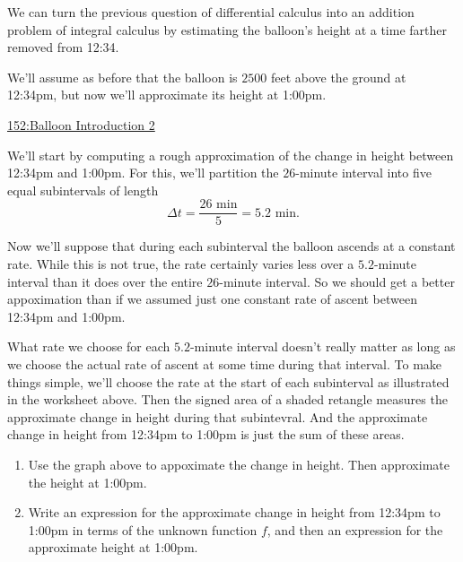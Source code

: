 \documentclass{ximera}
\begin{document}
We can turn the previous question of differential calculus into an addition problem of integral calculus by estimating the balloon's height at a time farther removed from 12:34. 

\begin{example} \label{ExLKDrDEfRE9}

We'll assume as before that the balloon is $2500$ feet above the ground at 12:34pm, but now we'll approximate its height at 1:00pm.

\begin{onlineOnly}
    \begin{center}
\end{center}
\end{onlineOnly}

\href{https://www.desmos.com/calculator/h6cworakdw}{152:Balloon Introduction 2}

We'll start by computing a rough approximation of the change in height between 12:34pm and 1:00pm. For this, we'll partition the $26$-minute interval into five equal subintervals of length 
\[
  \Delta t = \frac{26\text{ min}}{5} = 5.2 \text{ min}.
\]
 
Now we'll suppose that during each subinterval the balloon ascends at a constant rate. While this is not true, the rate certainly varies less over a $5.2$-minute interval than it does over the entire $26$-minute interval. So we should get a better appoximation  than if we assumed just one constant rate of ascent between 12:34pm and 1:00pm.

What rate we choose for each $5.2$-minute interval doesn't really matter as long as we choose the actual rate of ascent at some time during that interval. To make things simple, we'll choose the rate at the start of each subinterval as illustrated in the worksheet above. Then the signed area of a shaded retangle measures the approximate change in height during that subintevral. And the approximate change in height from 12:34pm to 1:00pm is just the sum of these areas.

\begin{enumerate}
\item Use the graph above to appoximate the change in height. Then approximate the height at 1:00pm.

\item Write an expression for the approximate change in height from 12:34pm to 1:00pm in terms of the unknown function $f$, and then an expression for the approximate height at 1:00pm.


\end{enumerate}
\end{example}
\end{document}
